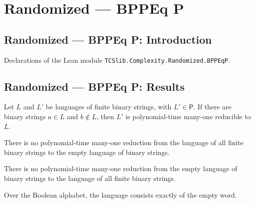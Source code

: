 \section{Randomized --- BPPEq P}
\subsection*{Randomized --- BPPEq P: Introduction}

Declarations of the Lean module \texttt{TCSlib.Complexity.Randomized.BPPEqP}.

\subsection*{Randomized --- BPPEq P: Results}

\begin{theorem}
\label{Randomized.polyTimeReducible_of_mem_P}
\leanok
{}
Let $L$ and $L'$ be languages of finite binary strings, with $L'\in\mathsf{P}$. If there
are binary strings $a\in L$ and $b\notin L$, then $L'$ is polynomial-time many-one
reducible to $L$.
\end{theorem}

\begin{theorem}
\label{Randomized.not_polyTimeReducible_empty}
\leanok
{}
There is no polynomial-time many-one reduction from the language of all finite binary
strings to the empty language of binary strings.
\end{theorem}

\begin{theorem}
\label{Randomized.not_polyTimeReducible_univ}
\leanok
{}
There is no polynomial-time many-one reduction from the empty language of binary strings
to the language of all finite binary strings.
\end{theorem}

\begin{definition}
\label{Randomized.emptyWordLang}
\leanok
Over the Boolean alphabet, the language consists exactly of the empty word.
\end{definition}

